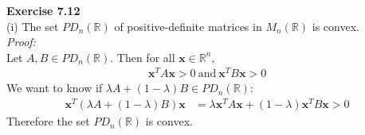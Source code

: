 \documentclass[letterpaper,12pt]{article}
\let\vec\mathbf
\theoremstyle{definition}
\begin{document}
\textbf{Exercise 7.12} \\
(i) The set $PD_n(\mathbb{R})$ of positive-definite matrices in $M_n(\mathbb{R})$ is convex. \\
\textit{Proof:} \\
Let $A, B \in PD_n(\mathbb{R})$. Then for all $\vec{x} \in \mathbb{R}^n$,
\begin{align*}
  \vec{x}^TA\vec{x} > 0 \ \text{and} \  \vec{x}^TB\vec{x} > 0
\end{align*}
We want to know if $\lambda A + (1 - \lambda)B \in PD_n(\mathbb{R})$:
\begin{align*}
  \vec{x}^T(\lambda A + (1 - \lambda)B)\vec{x}
  &= \lambda\vec{x}^TA\vec{x} + (1 - \lambda)\vec{x}^TB\vec{x} > 0
\end{align*}
Therefore the set $PD_n(\mathbb{R})$ is convex. \\
\end{document}
